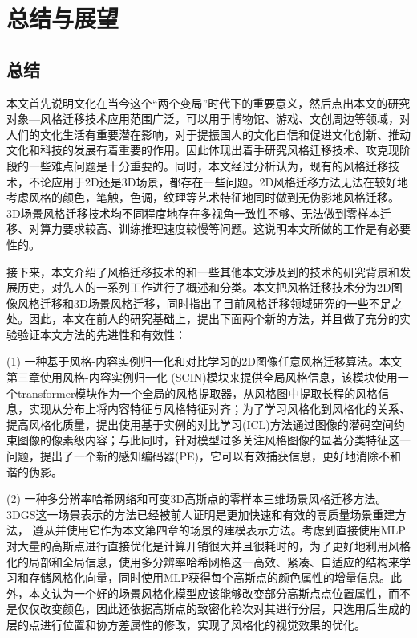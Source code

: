\chapter{总结与展望}
\section{总结}
本文首先说明文化在当今这个“两个变局”时代下的重要意义，然后点出本文的研究对象—风格迁移技术应用范围广泛，可以用于博物馆、游戏、文创周边等领域，对人们的文化生活有重要潜在影响，对于提振国人的文化自信和促进文化创新、推动文化和科技的发展有着重要的作用。因此体现出着手研究风格迁移技术、攻克现阶段的一些难点问题是十分重要的。同时，本文经过分析认为，现有的风格迁移技术，不论应用于2D还是3D场景，都存在一些问题。2D风格迁移方法无法在较好地考虑风格的颜色，笔触，色调，纹理等艺术特征地同时做到无伪影地风格迁移。3D场景风格迁移技术均不同程度地存在多视角一致性不够、无法做到零样本迁移、对算力要求较高、训练推理速度较慢等问题。这说明本文所做的工作是有必要性的。
\par 接下来，本文介绍了风格迁移技术的和一些其他本文涉及到的技术的研究背景和发展历史，对先人的一系列工作进行了概述和分类。本文把风格迁移技术分为2D图像风格迁移和3D场景风格迁移，同时指出了目前风格迁移领域研究的一些不足之处。因此，本文在前人的研究基础上，提出下面两个新的方法，并且做了充分的实验验证本文方法的先进性和有效性：

\par (1)  一种基于风格-内容实例归一化和对比学习的2D图像任意风格迁移算法。本文第三章使用风格-内容实例归一化 (SCIN)模块来提供全局风格信息，该模块使用一个transformer模块作为一个全局的风格提取器，从风格图中提取长程的风格信息，实现从分布上将内容特征与风格特征对齐；为了学习风格化到风格化的关系、提高风格化质量，提出使用基于实例的对比学习(ICL)方法通过图像的潜码空间约束图像的像素级内容；与此同时，针对模型过多关注风格图像的显著分类特征这一问题，提出了一个新的感知编码器(PE)，它可以有效捕获信息，更好地消除不和谐的伪影。   
\par (2)  一种多分辨率哈希网络和可变3D高斯点的零样本三维场景风格迁移方法。3DGS这一场景表示的方法已经被前人证明是更加快速和有效的高质量场景重建方法，
遵从并使用它作为本文第四章的场景的建模表示方法。考虑到直接使用MLP对大量的高斯点进行直接优化是计算开销很大并且很耗时的，为了更好地利用风格化的局部和全局信息，使用多分辨率哈希网格这一高效、紧凑、自适应的结构来学习和存储风格化向量，同时使用MLP获得每个高斯点的颜色属性的增量信息。此外，本文认为一个好的场景风格化模型应该能够改变部分高斯点点位置属性，而不是仅仅改变颜色，因此还依据高斯点的致密化轮次对其进行分层，只选用后生成的层的点进行位置和协方差属性的修改，实现了风格化的视觉效果的优化。

